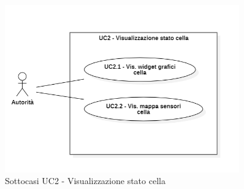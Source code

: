 \documentclass{article}
\begin{document}

\begin{figure}[H]
    \centering
    \includegraphics[width=0.9\textwidth]{Images/uc2_Subcase.PNG}
    \caption{Sottocasi UC2 - Visualizzazione stato cella}
    \label{fig:UC2_sub}
\end{figure}
\end{document}
